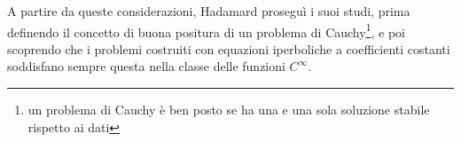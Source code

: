 A partire da queste considerazioni, Hadamard proseguì i suoi studi, prima definendo il concetto di buona positura di un problema di Cauchy\footnote{un problema di Cauchy è ben posto se ha una e una sola soluzione stabile rispetto ai dati}, e poi scoprendo che i problemi costruiti con equazioni iperboliche a coefficienti costanti soddisfano sempre questa nella classe delle funzioni $C^\infty$.

